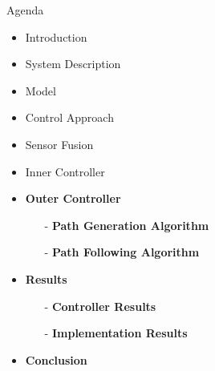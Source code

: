 
\begin{frame}{Agenda}{}
    \begin{itemize}
        \item Introduction
        \item System Description
        \item Model
        \item Control Approach
        \item Sensor Fusion
        \item Inner Controller
        \item \textcolor{aaublue}{\textbf{Outer Controller}}
        \begin{itemize}
            \item[-] \textcolor{aaublue}{\textbf{Path Generation Algorithm}}
            \item[-] \textcolor{aaublue}{\textbf{Path Following Algorithm}}
        \end{itemize}
        \item \textcolor{aaublue}{\textbf{Results}}
        \begin{itemize}
            \item[-] \textcolor{aaublue}{\textbf{Controller Results}}
            \item[-] \textcolor{aaublue}{\textbf{Implementation Results}}
        \end{itemize}
        \item \textcolor{aaublue}{\textbf{Conclusion}}
    \end{itemize}
\end{frame}